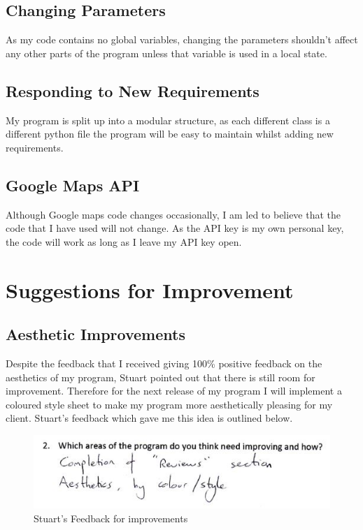 	\subsection{Changing Parameters}

As my code contains no global variables, changing the parameters shouldn't affect any other parts of the program unless that variable is used in a local state. 

	\subsection{Responding to New Requirements}

My program is split up into a modular structure, as each different class is a different python file the program will be easy to maintain whilst adding new requirements. 

	\subsection{Google Maps API}

Although Google maps code changes occasionally, I am led to believe that the code that I have used will not change. As the API key is my own personal key, the code will work as long as I leave my API key open.











\section{Suggestions for Improvement} 

	\subsection{Aesthetic Improvements}

Despite the feedback that I received giving 100\% positive feedback on the aesthetics of my program, Stuart pointed out that there is still room for improvement. Therefore for the next release of my program I will implement a coloured style sheet to make my program more aesthetically pleasing for my client. Stuart's feedback which gave me this idea is outlined below.

\begin{figure}[H]
    \includegraphics[width=\textwidth]{./Evaluation/images/StuImprovements.jpg}
    \caption{Stuart's Feedback for improvements} \label{fig:StuImprovementFeedback}
\end{figure}

